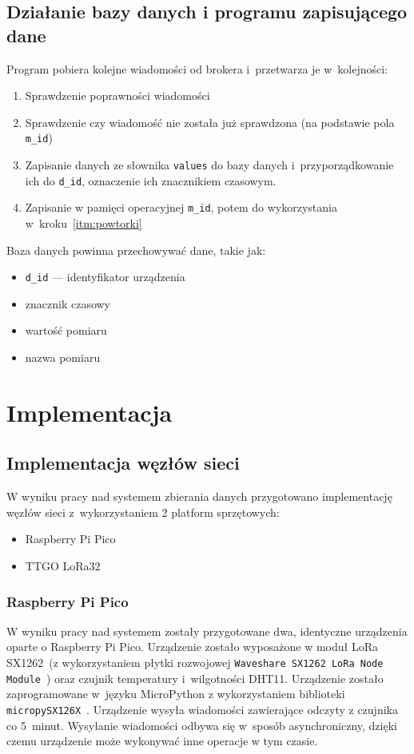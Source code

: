 \subsection{Działanie bazy danych i programu zapisującego dane}
Program pobiera kolejne wiadomości od brokera i~przetwarza je w~kolejności:
\begin{enumerate}
    \item Sprawdzenie poprawności wiadomości
    \item\label{itm:powtorki} Sprawdzenie czy wiadomość nie została już sprawdzona (na podstawie pola \texttt{m\_id})
    \item Zapisanie danych ze słownika \texttt{values} do bazy danych i~przyporządkowanie ich do \texttt{d\_id}, oznaczenie ich znacznikiem czasowym.
    \item Zapisanie w pamięci operacyjnej \texttt{m\_id}, potem do wykorzystania w~kroku~\ref{itm:powtorki}
\end{enumerate}
Baza danych powinna przechowywać dane, takie jak:
\begin{itemize}
    \item \texttt{d\_id} — identyfikator urządzenia
    \item znacznik czasowy
    \item wartość pomiaru
    \item nazwa pomiaru
\end{itemize}

\section{Implementacja}

\subsection{Implementacja węzłów sieci}
W wyniku pracy nad systemem zbierania danych przygotowano implementację węzłów sieci z~wykorzystaniem 2 platform sprzętowych:
\begin{itemize}
    \item Raspberry Pi Pico
    \item TTGO LoRa32
\end{itemize}

\subsubsection{Raspberry Pi Pico}

W wyniku pracy nad systemem zostały przygotowane dwa, identyczne urządzenia oparte o Raspberry Pi Pico.
Urządzenie zostało wyposażone w moduł LoRa SX1262~\cite{PICO:sx1262-doc}(z wykorzystaniem płytki rozwojowej \texttt{Waveshare SX1262 LoRa Node Module}~\cite{PICO:waveshare-doc}) oraz czujnik temperatury i~wilgotności DHT11.
Urządzenie zostało zaprogramowane w~języku MicroPython z wykorzystaniem biblioteki \texttt{micropySX126X}~\cite{PICO:lora-lib}.
Urządzenie wysyła wiadomości zawierające odczyty z czujnika co 5~minut.
Wysyłanie wiadomości odbywa się w~sposób asynchroniczny, dzięki czemu urządzenie może wykonywać inne operacje w tym czasie.

